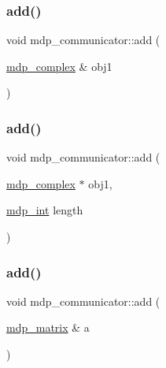 \mbox{\label{classmdp__communicator_a94f4656c5dd9befe04abe0cf5bf83de0}} 
\subsubsection{\texorpdfstring{add()}{add()}\hspace{0.1cm}{\footnotesize\ttfamily [11/15]}}
{\footnotesize\ttfamily void mdp\+\_\+communicator\+::add (\begin{DoxyParamCaption}\item[{\hyperlink{classmdp__complex}{mdp\+\_\+complex} \&}]{obj1 }\end{DoxyParamCaption})\hspace{0.3cm}{\ttfamily [inline]}}

\mbox{\label{classmdp__communicator_aa5349744a5384adbbdd3cf7dc2a5b95a}} 
\subsubsection{\texorpdfstring{add()}{add()}\hspace{0.1cm}{\footnotesize\ttfamily [12/15]}}
{\footnotesize\ttfamily void mdp\+\_\+communicator\+::add (\begin{DoxyParamCaption}\item[{\hyperlink{classmdp__complex}{mdp\+\_\+complex} $\ast$}]{obj1,  }\item[{\hyperlink{mdp__global__vars_8h_aaa1ad9d0dcd2124aa5af0120d9954174}{mdp\+\_\+int}}]{length }\end{DoxyParamCaption})\hspace{0.3cm}{\ttfamily [inline]}}

\mbox{\label{classmdp__communicator_a5e533ae9ef363e9e39dfc9f788aeab19}} 
\subsubsection{\texorpdfstring{add()}{add()}\hspace{0.1cm}{\footnotesize\ttfamily [13/15]}}
{\footnotesize\ttfamily void mdp\+\_\+communicator\+::add (\begin{DoxyParamCaption}\item[{\hyperlink{classmdp__matrix}{mdp\+\_\+matrix} \&}]{a }\end{DoxyParamCaption})\hspace{0.3cm}{\ttfamily [inline]}}

